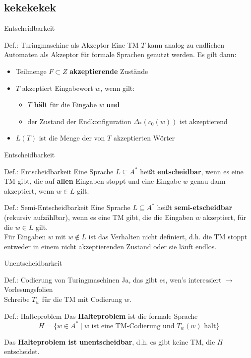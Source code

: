 \subsection{kekekekek}

\begin{frame}{Entscheidbarkeit}
	\begin{block}{Def.: Turingmaschine als Akzeptor}
		Eine TM $T$ kann analog zu endlichen Automaten als Akzeptor für formale Sprachen genutzt werden. Es gilt dann:
		\begin{itemize}
			\item Teilmenge $F \subset Z$ \textbf{akzeptierende} Zustände
			\item $T$ akzeptiert Eingabewort $w$, wenn gilt:
			\begin{itemize}
				\item $T$ \textbf{hält} für die Eingabe $w$ \textbf{und}
				\item der Zustand der Endkonfiguration $\Delta_*(c_0(w))$ ist akzeptierend
			\end{itemize}
			\item $L(T)$ ist die Menge der von $T$ akzeptierten Wörter
		\end{itemize}
	\end{block}
\end{frame}

\begin{frame}{Entscheidbarkeit}
    \begin{block}{Def.: Entscheidbarkeit}
    	Eine Sprache $L \subseteq A^*$ heißt \textbf{entscheidbar}, wenn es eine TM gibt, die auf \textbf{allen} Eingaben stoppt und eine Eingabe $w$ genau dann akzeptiert, wenn $w\in L$ gilt.
    \end{block}
\pause
    \begin{block}{Def.: Semi-Entscheidbarkeit}
    	Eine Sprache $L \subseteq A^*$ heißt \textbf{semi-etscheidbar} (rekursiv aufzählbar), wenn es eine TM gibt, die die Eingaben $w$ akzeptiert, für die $w\in L$ gilt.\\
    	Für Eingaben $w$ mit $w \notin L$ ist das Verhalten nicht definiert, d.h. die TM stoppt entweder in einem nicht akzeptierenden Zustand oder sie läuft endlos.
    \end{block} 
\end{frame}

\begin{frame}{Unentscheidbarkeit}
    \begin{block}{Def.: Codierung von Turingmaschinen}
    	Ja, das gibt es, wen's interessiert $\rightarrow$ Vorlesungsfolien\\
    	Schreibe $T_w$ für die TM mit Codierung $w$.
    \end{block}
\pause
    \begin{block}{Def.: Halteproblem}
    	Das \textbf{Halteproblem} ist die formale Sprache
    	\[
			H = \{ w\in A^* \mid \text{$w$ ist eine TM-Codierung und $T_w(w)$ hält} \}
		\]

		Das \textbf{Halteproblem ist unentscheidbar}, d.h. es gibt keine TM, die $H$ entscheidet.
    \end{block}
\end{frame}